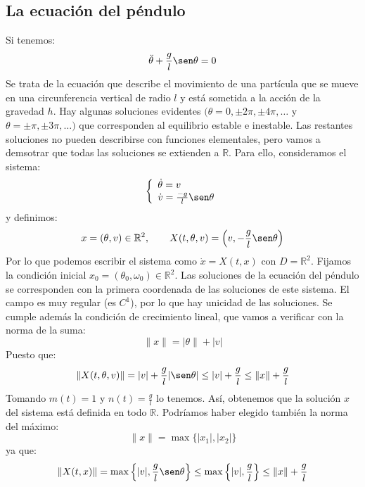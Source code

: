 \subsection{La ecuación del péndulo}
\noindent
Si tenemos:
\begin{equation*}
    \ddot{\theta} + \frac{g}{l}\sen\theta = 0
\end{equation*}
Se trata de la ecuación que describe el movimiento de una partícula que se mueve en una circunferencia vertical de radio $l$ y está sometida a la acción de la gravedad $h$. Hay algunas soluciones evidentes $(\theta = 0, \pm 2\pi, \pm 4\pi ,\ldots$ y $\theta = \pm \pi, \pm 3\pi, \ldots)$  que corresponden al equilibrio estable e inestable. Las restantes soluciones no pueden describirse con funciones elementales, pero vamos a demsotrar que todas las soluciones se extienden a $\mathbb{R}$. Para ello, consideramos el sistema:
\begin{equation*}
    \left\{\begin{array}{l}
            \dot{\theta} = v \\
            \dot{v} = \frac{-g}{l}\sen\theta
    \end{array}\right.
\end{equation*}
y definimos:
\begin{equation*}
    x=(\theta,v)\in \mathbb{R}^2, \qquad X(t,\theta,v) = \left(v,-\frac{g}{l}\sen\theta\right)
\end{equation*}
Por lo que podemos escribir el sistema como $\dot{x} = X(t,x)$ con $D=\mathbb{R}^2$. Fijamos la condición inicial $x_0 = (\theta_0, \omega_0)\in \mathbb{R}^2$. Las soluciones de la ecuación del péndulo se corresponden con la primera coordenada de las soluciones de este sistema. El campo es muy regular (es $C^1$), por lo que hay unicidad de las soluciones. Se cumple además la condición de crecimiento lineal, que vamos a verificar con la norma de la suma:
\begin{equation*}
    \|x\| = |\theta\| + |v|
\end{equation*}
Puesto que:
\begin{equation*}
    \|X(t,\theta,v)\| = |v| + \frac{g}{l}|\sen\theta| \leq |v| + \frac{g}{l}\leq \|x\| + \frac{g}{l}
\end{equation*}
Tomando $m(t) = 1$ y $n(t) = \frac{g}{l}$ lo tenemos. Así, obtenemos que la solución $x$ del sistema está definida en todo $\mathbb{R}$. Podríamos haber elegido también la norma del máximo:
\begin{equation*}
    \|x\| = \max\{|x_1|, |x_2|\}
\end{equation*}
ya que:
\begin{equation*}
    \|X(t,x)\| = \max\left\{|v|, \frac{g}{l}\sen\theta\right\} \leq \max\left\{|v|,\frac{g}{l}\right\} \leq \|x\| + \frac{g}{l}
\end{equation*}

